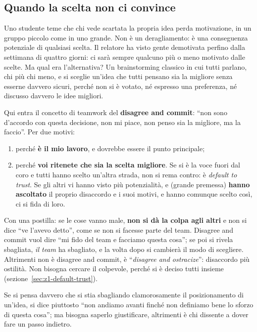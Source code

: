\subsection{Quando la scelta non ci convince}

Uno studente teme che chi vede scartata la propria idea perda motivazione, in un gruppo
piccolo come in uno grande. Non è un deragliamento: è una conseguenza potenziale di
qualsiasi scelta. Il relatore ha visto gente demotivata perfino dalla settimana di quattro
giorni: ci sarà sempre qualcuno più o meno motivato dalle scelte. Ma qual era l'alternativa?
Un brainstorming classico in cui tutti parlano, chi più chi meno, e si sceglie un'idea che
tutti pensano sia la migliore senza esserne davvero sicuri, perché non si è votato, né
espresso una preferenza, né discusso davvero le idee migliori.

Qui entra il concetto di teamwork del \textbf{disagree and commit}: ``non sono d'accordo con
questa decisione, non mi piace, non penso sia la migliore, ma la faccio''. Per due motivi:
\begin{enumerate}
  \item perché \textbf{è il mio lavoro}, e dovrebbe essere il punto principale;
  \item perché \textbf{voi ritenete che sia la scelta migliore}. Se si è la voce fuori dal coro
        e tutti hanno scelto un'altra strada, non si rema contro: è \emph{default to trust}.
        Se gli altri vi hanno visto più potenzialità, e (grande premessa) \textbf{hanno
        ascoltato} il proprio disaccordo e i suoi motivi, e hanno comunque scelto così, ci si
        fida di loro.
\end{enumerate}
Con una postilla: se le cose vanno male, \textbf{non si dà la colpa agli altri} e non si dice
``ve l'avevo detto'', come se non si facesse parte del team. Disagree and commit vuol dire ``mi
fido del team e facciamo questa cosa''; se poi si rivela sbagliata, \emph{il team} ha
sbagliato, e la volta dopo si cambierà il modo di scegliere. Altrimenti non è disagree and
commit, è ``\emph{disagree and ostracize}'': disaccordo più ostilità. Non bisogna cercare il
colpevole, perché si è deciso tutti insieme (sezione~\ref{sec:z1-default-trust}).

Se si pensa davvero che si stia sbagliando clamorosamente il posizionamento di un'idea, si
dice piuttosto ``non andiamo avanti finché non definiamo bene lo sforzo di questa cosa''; ma
bisogna saperlo giustificare, altrimenti è chi dissente a dover fare un passo indietro.

